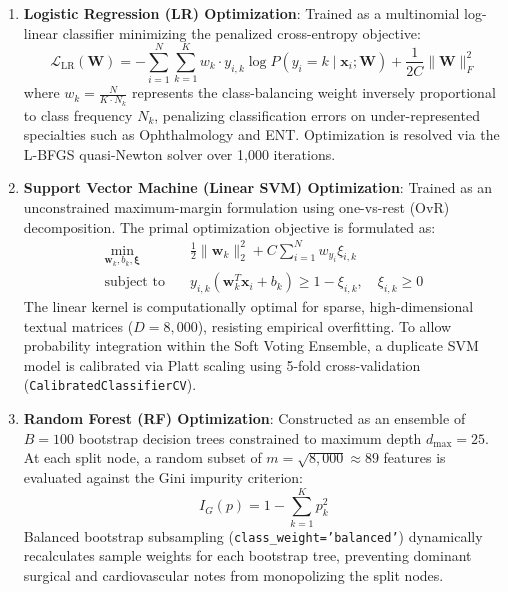 \begin{enumerate}
    \item \textbf{Logistic Regression (LR) Optimization}:
    Trained as a multinomial log-linear classifier minimizing the penalized cross-entropy objective:
    \begin{equation}
        \mathcal{L}_{\text{LR}}(\mathbf{W}) = -\sum_{i=1}^{N} \sum_{k=1}^{K} w_k \cdot y_{i,k} \log P(y_i = k \mid \mathbf{x}_i; \mathbf{W}) + \frac{1}{2C} \|\mathbf{W}\|_F^2
    \end{equation}
    where $w_k = \frac{N}{K \cdot N_k}$ represents the class-balancing weight inversely proportional to class frequency $N_k$, penalizing classification errors on under-represented specialties such as Ophthalmology and ENT. Optimization is resolved via the L-BFGS quasi-Newton solver over 1,000 iterations.

    \item \textbf{Support Vector Machine (Linear SVM) Optimization}:
    Trained as an unconstrained maximum-margin formulation using one-vs-rest (OvR) decomposition. The primal optimization objective is formulated as:
    \begin{equation}
    \begin{aligned}
        \min_{\mathbf{w}_k, b_k, \boldsymbol{\xi}} \quad & \frac{1}{2} \|\mathbf{w}_k\|_2^2 + C \sum_{i=1}^{N} w_{y_i} \xi_{i,k} \\
        \text{subject to} \quad & y_{i,k}(\mathbf{w}_k^T \mathbf{x}_i + b_k) \ge 1 - \xi_{i,k}, \quad \xi_{i,k} \ge 0
    \end{aligned}
    \end{equation}
    The linear kernel is computationally optimal for sparse, high-dimensional textual matrices ($D = 8,000$), resisting empirical overfitting. To allow probability integration within the Soft Voting Ensemble, a duplicate SVM model is calibrated via Platt scaling using 5-fold cross-validation (\texttt{CalibratedClassifierCV}).

    \item \textbf{Random Forest (RF) Optimization}:
    Constructed as an ensemble of $B = 100$ bootstrap decision trees constrained to maximum depth $d_{\text{max}} = 25$. At each split node, a random subset of $m = \sqrt{8,000} \approx 89$ features is evaluated against the Gini impurity criterion:
    \begin{equation}
        I_G(p) = 1 - \sum_{k=1}^{K} p_k^2
    \end{equation}
    Balanced bootstrap subsampling (\texttt{class\_weight='balanced'}) dynamically recalculates sample weights for each bootstrap tree, preventing dominant surgical and cardiovascular notes from monopolizing the split nodes.


\end{enumerate}

